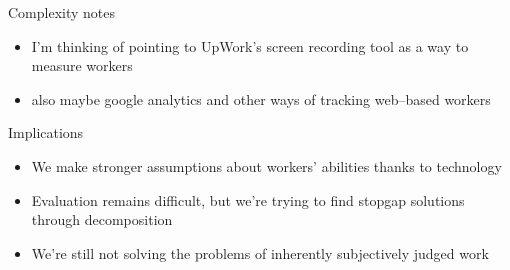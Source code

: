 \documentclass[presentation]{subfiles}
\begin{document}
\begin{frame}{Complexity} %
    notes
    \begin{itemize}
      \item I'm thinking of pointing to UpWork's screen recording tool as a way to measure workers
      \item also maybe google analytics and other ways of tracking web--based workers
    \end{itemize}
\end{frame}

\begin{frame}{Implications}
  \begin{itemize}
    \item We make stronger assumptions about workers' abilities thanks to technology
    \item Evaluation remains difficult, but we're trying to find stopgap solutions through decomposition
    \item We're still not solving the problems of inherently subjectively judged work
  \end{itemize}
\end{frame}

\onlyinsubfile{
  \printbibliography{}
}
\end{document}
